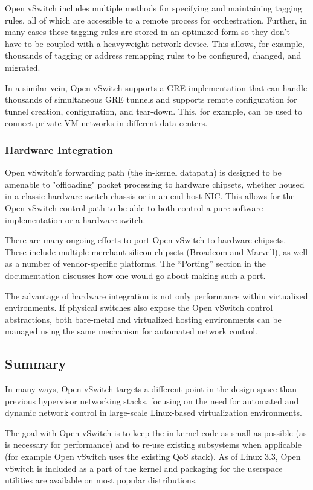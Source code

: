 \documentclass[../sn.tex]{subfiles}
\begin{document}
Open vSwitch includes multiple methods for specifying and maintaining tagging rules, all of which are accessible to a remote process for orchestration.
Further, in many cases these tagging rules are stored in an optimized form so they don't have to be coupled with a heavyweight network device.
This allows, for example, thousands of tagging or address remapping rules to be configured, changed, and migrated.

In a similar vein, Open vSwitch supports a GRE implementation that can handle thousands of simultaneous GRE tunnels and supports remote configuration for tunnel creation, configuration, and tear-down.
This, for example, can be used to connect private VM networks in different data centers.

\subsubsection{Hardware Integration}
Open vSwitch's forwarding path (the in-kernel datapath) is designed to be amenable to "offloading" packet processing to hardware chipsets, whether housed in a classic hardware switch chassis or in an end-host NIC.
This allows for the Open vSwitch control path to be able to both control a pure software implementation or a hardware switch.

There are many ongoing efforts to port Open vSwitch to hardware chipsets.
These include multiple merchant silicon chipsets (Broadcom and Marvell), as well as a number of vendor-specific platforms.
The “Porting” section in the documentation discusses how one would go about making such a port.

The advantage of hardware integration is not only performance within virtualized environments.
If physical switches also expose the Open vSwitch control abstractions, both bare-metal and virtualized hosting environments can be managed using the same mechanism for automated network control.

\subsection{Summary}
In many ways, Open vSwitch targets a different point in the design space than previous hypervisor networking stacks, focusing on the need for automated and dynamic network control in large-scale Linux-based virtualization environments.

The goal with Open vSwitch is to keep the in-kernel code as small as possible (as is necessary for performance) and to re-use existing subsystems when applicable (for example Open vSwitch uses the existing QoS stack).
As of Linux 3.3, Open vSwitch is included as a part of the kernel and packaging for the userspace utilities are available on most popular distributions.
\end{document}
